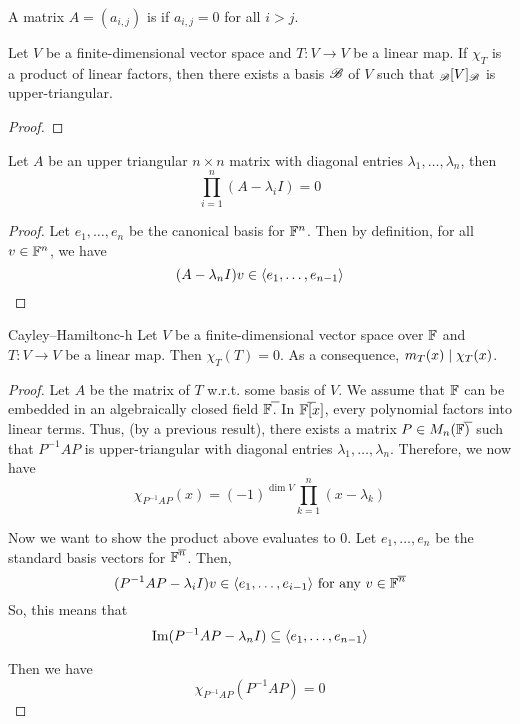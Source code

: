 \documentclass{styles/tufte}
\begin{document}
\begin{definition}{}{}
  A matrix $A = (a_{i,j})$ is  if $a_{i,j} = 0$ for all $i > j$.
\end{definition}

\begin{theorem}{}{}
  Let $V$ be a finite-dimensional vector space and $T: V \to V$ be a linear map. If $\chi_T$ is a product of linear factors, then there exists a basis $\mathscr{B}$ of $V$ such that ${}_{\mathscr{B}}[V]_{\mathscr{B}}$ is upper-triangular.
\end{theorem}
\begin{proof}
  
\end{proof}

\begin{lemma}{}{}
  Let $A$ be an upper triangular $n \times n$ matrix with diagonal entries $\lambda_1, \dots, \lambda_n$, then
  \[ \prod_{i=1}^n (A - \lambda_i I) = 0 \]
\end{lemma}
\begin{proof}
  Let $e_1, \dots, e_n$ be the canonical basis for $\mathbb{F}^n$. Then by definition, for all $v \in \mathbb{F}^n$, we have
  \[ (A - \lambda_n I)v \in \langle e_1, \dots, e_{n-1} \rangle \]
\end{proof}

\begin{theorem}{Cayley--Hamilton}{c-h}
  Let $V$ be a finite-dimensional vector space over $\mathbb{F}$ and $T: V \to V$ be a linear map. Then $\chi_T(T) = 0$. As a consequence, $m_T(x) \mid \chi_T(x)$.
\end{theorem}
\begin{proof}
  Let $A$ be the matrix of $T$ w.r.t. some basis of $V$. We assume that $\mathbb{F}$ can be embedded in an algebraically closed field $\overline{\FF}$. In $\overline{\FF}[x]$, every polynomial factors into linear terms. Thus, (by a previous result), there exists a matrix $P \in M_n(\overline{\FF})$ such that $P^{-1}AP$ is upper-triangular with diagonal entries $\lambda_1, \dots, \lambda_n$. Therefore, we now have
  \[ \chi_{P^{-1}AP}(x) = (-1)^{\dim V} \prod_{k=1}^n (x - \lambda_k) \]
  
  Now we want to show the product above evaluates to $0$. Let $e_1, \dots, e_n$ be the standard basis vectors for $\overline{\FF}^n$. Then,
  \[ (P^{-1}AP - \lambda_i I) v \in \abrak{e_1, \dots, e_{i-1}} \text{ for any $v \in \overline{\FF}^n$} \]
  So, this means that
  \[ \operatorname{Im}(P^{-1}AP - \lambda_n I) \subseteq \langle e_1, \dots, e_{n-1} \rangle \]
  
  
  Then we have
  \[ \chi_{P^{-1}AP}(P^{-1}AP) = 0 \]
\end{proof}
\end{document}
